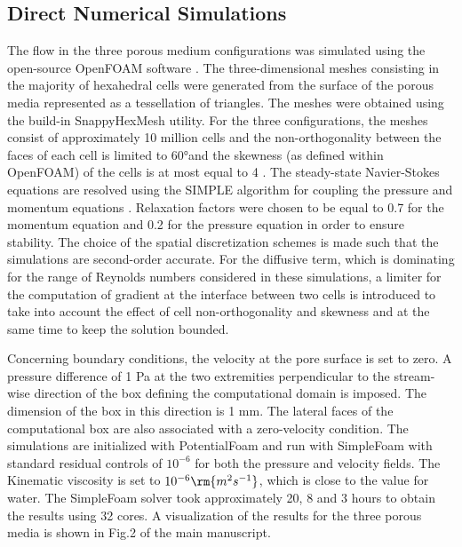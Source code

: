 \documentclass[draft,jgrga]{agutexSI2019}
\begin{document}
\begin{article}
\subsection{Direct Numerical Simulations}

The flow in the three porous medium configurations was simulated using the open-source OpenFOAM software .
The three-dimensional meshes consisting in the majority of hexahedral cells were generated from the surface of the porous media represented as a tessellation of triangles. The meshes were obtained using the build-in SnappyHexMesh utility. For the three configurations, the meshes consist of approximately 10 million cells and the non-orthogonality between the faces of each cell is limited to 60°and the skewness (as defined within OpenFOAM) of the cells is at most equal to 4 \cite{moukalled_finite_2016}. The steady-state Navier-Stokes equations are resolved using the SIMPLE algorithm for coupling the pressure and momentum equations \cite{jasak_error_1996}. Relaxation factors were chosen to be equal to 0.7 for the momentum equation and 0.2 for the pressure equation in order to ensure stability. The choice of the spatial discretization schemes is made such that the simulations are second-order accurate. For the diffusive term, which is dominating for the range of Reynolds numbers considered in these simulations, a limiter for the computation of gradient at the interface between two cells is introduced to take into account the effect of cell non-orthogonality and skewness and at the same time to keep the solution bounded. 

Concerning boundary conditions, the velocity at the pore surface is set to zero. A pressure difference of 1 Pa at the two extremities perpendicular to the stream-wise direction of the box defining the computational domain is imposed. The dimension of the box in this direction is 1 mm. The lateral faces of the computational box are also associated with a zero-velocity condition. 
The simulations are initialized with PotentialFoam and run with SimpleFoam with standard residual controls of $10^{-6}$ for both the pressure and velocity fields. The Kinematic viscosity is set to $10^{-6}\rm{m^2s^{-1}}$, which is close to the value for water. The SimpleFoam solver took approximately 20, 8 and 3 hours to obtain the results using 32 cores. A visualization of the results for the three porous media is shown in Fig.2 of the main manuscript.


\end{article}
\end{document}
